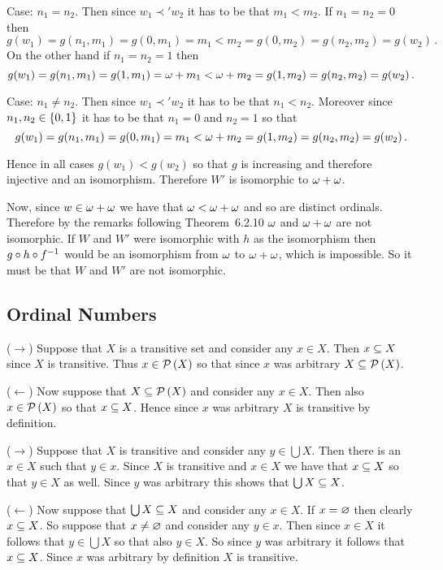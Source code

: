 \begin{solution}
    Case: $n_1 = n_2$.
    Then since $w_1 \prec' w_2$ it has to be that $m_1 < m_2$.
    If $n_1 = n_2 = 0$ then
    $$
    g(w_1) = g(n_1,m_1) = g(0,m_1) = m_1 < m_2 = g(0, m_2) = g(n_2,m_2) = g(w_2) \,.
    $$
    On the other hand if $n_1 = n_2 = 1$ then
    $$
    g(w_1) = g(n_1,m_1) = g(1,m_1) = \w + m_1 < \w + m_2 = g(1, m_2) = g(n_2,m_2) = g(w_2) \,.
    $$

    Case: $n_1 \neq n_2$.
    Then since $w_1 \prec' w_2$ it has to be that $n_1 < n_2$.
    Moreover since $n_1,n_2 \in \braces{0,1}$ it has to be that $n_1 = 0$ and $n_2 = 1$ so that
    $$
    g(w_1) = g(n_1,m_1) = g(0,m_1) = m_1 < \w + m_2 = g(1,m_2) = g(n_2,m_2) = g(w_2) \,.
    $$

    Hence in all cases $g(w_1) < g(w_2)$ so that $g$ is increasing and therefore injective and an isomorphism.
    Therefore $W'$ is isomorphic to $\w + \w$.

    Now, since $w \in \w+\w$ we have that $\w < \w+\w$ and so are distinct ordinals.
    Therefore by the remarks following Theorem~6.2.10 $\w$ and $\w+\w$ are not isomorphic.
    If $W$ and $W'$ were isomorphic with $h$ as the isomorphism then $g \circ h \circ \inv{f}$ would be an isomorphism from $\w$ to $\w + \w$, which is impossible.
    So it must be that $W$ and $W'$ are not isomorphic. \qedsymbol
\end{solution}

\subsection{Ordinal Numbers}

\begin{solution}
	($\to$) Suppose that $X$ is a transitive set and consider any $x \in X$.
    Then $x \ss X$ since $X$ is transitive.
    Thus $x \in \pset{X}$ so that since $x$ was arbitrary $X \ss \pset{X}$.

    ($\leftarrow$) Now suppose that $X \ss \pset{X}$ and consider any $x \in X$.
    Then also $x \in \pset{X}$ so that $x \ss X$.
    Hence since $x$ was arbitrary $X$ is transitive by definition. \qedsymbol
\end{solution}


\begin{solution}
    ($\to$) Suppose that $X$ is transitive and consider any $y \in \bigcup X$.
    Then there is an $x \in X$ such that $y \in x$.
    Since $X$ is transitive and $x \in X$ we have that $x \ss X$ so that $y \in X$ as well.
    Since $y$ was arbitrary this shows that $\bigcup X \ss X$.

    ($\leftarrow$) Now suppose that $\bigcup X \ss X$ and consider any $x \in X$.
    If $x = \es$ then clearly $x \ss X$.
    So suppose that $x \neq \es$ and consider any $y \in x$.
    Then since $x \in X$ it follows that $y \in \bigcup X$ so that also $y \in X$.
    So since $y$ was arbitrary it follows that $x \ss X$.
    Since $x$ was arbitrary by definition $X$ is transitive. \qedsymbol
\end{solution}

